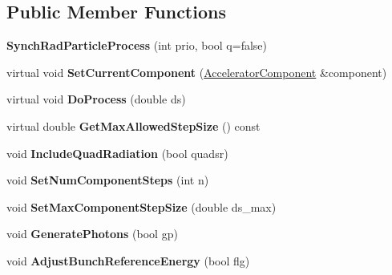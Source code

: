 \subsection*{Public Member Functions}
\begin{DoxyCompactItemize}
\item 
\mbox{\label{classParticleTracking_1_1SynchRadParticleProcess_a28007b064c890de5cb590c4a3dfdd5f1}} 
{\bfseries Synch\+Rad\+Particle\+Process} (int prio, bool q=false)
\item 
\mbox{\label{classParticleTracking_1_1SynchRadParticleProcess_a9332768fa75f302fbf0abcd93f71a00b}} 
virtual void {\bfseries Set\+Current\+Component} (\hyperlink{classAcceleratorComponent}{Accelerator\+Component} \&component)
\item 
\mbox{\label{classParticleTracking_1_1SynchRadParticleProcess_acd05cebb9fd326111e4c7991d24435f8}} 
virtual void {\bfseries Do\+Process} (double ds)
\item 
\mbox{\label{classParticleTracking_1_1SynchRadParticleProcess_ad68ce4b8c82dabc9edfe329e1d3aa4a3}} 
virtual double {\bfseries Get\+Max\+Allowed\+Step\+Size} () const
\item 
\mbox{\label{classParticleTracking_1_1SynchRadParticleProcess_abe6b014b4f84ca3db776d96a759b99dd}} 
void {\bfseries Include\+Quad\+Radiation} (bool quadsr)
\item 
\mbox{\label{classParticleTracking_1_1SynchRadParticleProcess_a58e774a5ba356cea1279e982b17d66f9}} 
void {\bfseries Set\+Num\+Component\+Steps} (int n)
\item 
\mbox{\label{classParticleTracking_1_1SynchRadParticleProcess_a44f214e439bda279a4d159557b9a444b}} 
void {\bfseries Set\+Max\+Component\+Step\+Size} (double ds\+\_\+max)
\item 
\mbox{\label{classParticleTracking_1_1SynchRadParticleProcess_abca6bd09eb81dfebb3952ad6ca5b5369}} 
void {\bfseries Generate\+Photons} (bool gp)
\item 
\mbox{\label{classParticleTracking_1_1SynchRadParticleProcess_a024838de880be22f695ed9acc6f687b9}} 
void {\bfseries Adjust\+Bunch\+Reference\+Energy} (bool flg)
\end{DoxyCompactItemize}
